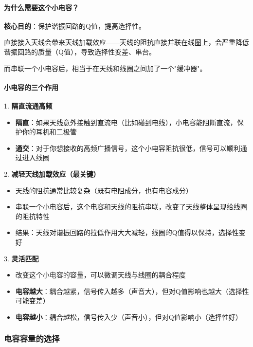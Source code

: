 \documentclass[12pt,UTF8]{ctexbook}
\begin{document}
\paragraph{为什么需要这个小电容？}

\textbf{核心目的}：保护谐振回路的Q值，提高选择性。

直接接入天线会带来天线加载效应——天线的阻抗直接并联在线圈上，会严重降低谐振回路的质量（Q值），导致选择性变差、串台。

而串联一个小电容后，相当于在天线和线圈之间加了一个"缓冲器"。

\paragraph{小电容的三个作用}

1. \textbf{隔直流通高频}
\begin{itemize}[leftmargin=3.5em]
	\item \textbf{隔直}：如果天线意外接触到直流电（比如碰到电线），小电容能阻断直流，保护你的耳机和二极管
	\item \textbf{通交}：对于你想接收的高频广播信号，这个小电容阻抗很低，信号可以顺利通过进入线圈
\end{itemize}

2. \textbf{减轻天线加载效应（最关键）}
\begin{itemize}[leftmargin=3.5em]
	\item 天线的阻抗通常比较复杂（既有电阻成分，也有电容成分）
	\item 串联一个小电容后，这个电容和天线的阻抗串联，改变了天线整体呈现给线圈的阻抗特性
	\item 结果：天线对谐振回路的拉低作用大大减轻，线圈的Q值得以保持，选择性变好
\end{itemize}

3. \textbf{灵活匹配}
\begin{itemize}[leftmargin=3.5em]
	\item 改变这个小电容的容量，可以微调天线与线圈的耦合程度
	\item \textbf{电容越大}：耦合越紧，信号传入越多（声音大），但对Q值影响也越大（选择性可能变差）
	\item \textbf{电容越小}：耦合越松，信号传入少（声音小），但对Q值影响小（选择性好）
\end{itemize}

\subsubsection{电容容量的选择}
\end{document}

